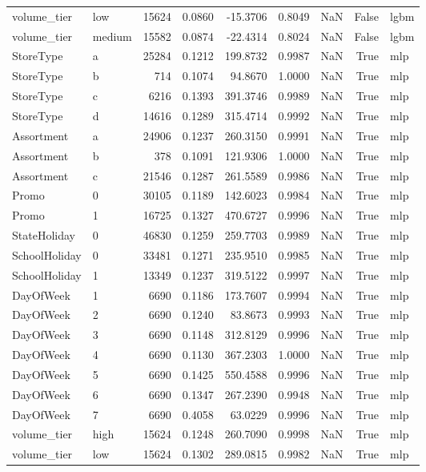 \begin{table}
\begin{tabular}{llrrrrrrl}
volume\_tier & low & 15624 & 0.0860 & -15.3706 & 0.8049 & NaN & False & lgbm \\
volume\_tier & medium & 15582 & 0.0874 & -22.4314 & 0.8024 & NaN & False & lgbm \\
StoreType & a & 25284 & 0.1212 & 199.8732 & 0.9987 & NaN & True & mlp \\
StoreType & b & 714 & 0.1074 & 94.8670 & 1.0000 & NaN & True & mlp \\
StoreType & c & 6216 & 0.1393 & 391.3746 & 0.9989 & NaN & True & mlp \\
StoreType & d & 14616 & 0.1289 & 315.4714 & 0.9992 & NaN & True & mlp \\
Assortment & a & 24906 & 0.1237 & 260.3150 & 0.9991 & NaN & True & mlp \\
Assortment & b & 378 & 0.1091 & 121.9306 & 1.0000 & NaN & True & mlp \\
Assortment & c & 21546 & 0.1287 & 261.5589 & 0.9986 & NaN & True & mlp \\
Promo & 0 & 30105 & 0.1189 & 142.6023 & 0.9984 & NaN & True & mlp \\
Promo & 1 & 16725 & 0.1327 & 470.6727 & 0.9996 & NaN & True & mlp \\
StateHoliday & 0 & 46830 & 0.1259 & 259.7703 & 0.9989 & NaN & True & mlp \\
SchoolHoliday & 0 & 33481 & 0.1271 & 235.9510 & 0.9985 & NaN & True & mlp \\
SchoolHoliday & 1 & 13349 & 0.1237 & 319.5122 & 0.9997 & NaN & True & mlp \\
DayOfWeek & 1 & 6690 & 0.1186 & 173.7607 & 0.9994 & NaN & True & mlp \\
DayOfWeek & 2 & 6690 & 0.1240 & 83.8673 & 0.9993 & NaN & True & mlp \\
DayOfWeek & 3 & 6690 & 0.1148 & 312.8129 & 0.9996 & NaN & True & mlp \\
DayOfWeek & 4 & 6690 & 0.1130 & 367.2303 & 1.0000 & NaN & True & mlp \\
DayOfWeek & 5 & 6690 & 0.1425 & 550.4588 & 0.9996 & NaN & True & mlp \\
DayOfWeek & 6 & 6690 & 0.1347 & 267.2390 & 0.9948 & NaN & True & mlp \\
DayOfWeek & 7 & 6690 & 0.4058 & 63.0229 & 0.9996 & NaN & True & mlp \\
volume\_tier & high & 15624 & 0.1248 & 260.7090 & 0.9998 & NaN & True & mlp \\
volume\_tier & low & 15624 & 0.1302 & 289.0815 & 0.9982 & NaN & True & mlp \\

\end{tabular}
\end{table}
